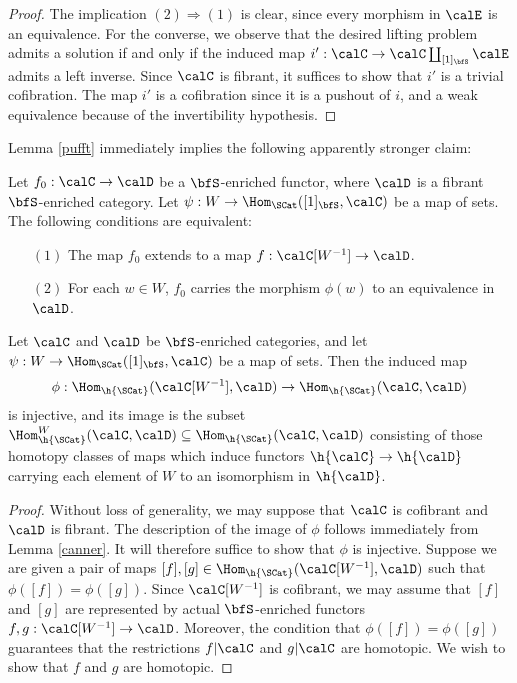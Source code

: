 \begin{Simplicial Categories}
\begin{proof}
The implication $(2) \Rightarrow (1)$ is clear, since every morphism in
$\calE$ is an equivalence. For the converse, we observe that
the desired lifting problem admits a solution if and only if the induced map
$i': \calC \rightarrow \calC \coprod_{[1]_{\bfS} } \calE$ admits a left inverse.
Since $\calC$ is fibrant, it suffices to show that $i'$ is a trivial cofibration.
The map $i'$ is a cofibration since it is a pushout of $i$, and a weak equivalence
because of the invertibility hypothesis. 
\end{proof}

Lemma \ref{pufft} immediately implies the following apparently stronger claim:

\begin{lemma}\label{canner}
Let $f_0: \calC \rightarrow \calD$ be a $\bfS$-enriched functor, where
$\calD$ is a fibrant $\bfS$-enriched category. Let $\psi: W \rightarrow \Hom_{\SCat}([1]_{\bfS},\calC)$ be a map of sets. The following conditions are equivalent:
\begin{itemize}
\item[$(1)$] The map $f_0$ extends to a map $f: \calC[W^{-1}] \rightarrow \calD$.
\item[$(2)$] For each $w \in W$, $f_0$ carries the morphism $\phi(w)$ to an equivalence in $\calD$.
\end{itemize}
\end{lemma}

\begin{proposition}\label{postcan}
Let $\calC$ and $\calD$ be $\bfS$-enriched categories, and let
$\psi: W \rightarrow \Hom_{\SCat}( [1]_{\bfS}, \calC)$ be a map of sets.
Then the induced map
$$ \phi: \Hom_{\h{\SCat}}( \calC[W^{-1}], \calD) \rightarrow \Hom_{\h{\SCat}}(\calC, \calD)$$
is injective, and its image is the subset $\Hom^{W}_{\h{\SCat}}(\calC, \calD)
\subseteq \Hom_{\h{\SCat}}(\calC, \calD)$ consisting of those homotopy classes of maps
which induce functors $\h{\calC} \rightarrow \h{\calD}$ carrying each element of $W$ to an isomorphism in $\h{\calD}$. 
\end{proposition}

\begin{proof}
Without loss of generality, we may suppose that $\calC$ is cofibrant and $\calD$ is fibrant.
The description of the image of $\phi$ follows immediately from Lemma \ref{canner}.
It will therefore suffice to show that $\phi$ is injective. Suppose we are given a pair of maps
$[f], [g] \in \Hom_{ \h{\SCat}}( \calC[W^{-1}], \calD)$ such that $\phi( [f] ) = \phi( [g] )$. Since
$\calC[ W^{-1}]$ is cofibrant, we may assume that $[f]$ and $[g]$ are represented by
actual $\bfS$-enriched functors $f,g: \calC[W^{-1}] \rightarrow \calD$. Moreover, the
condition that $\phi( [f] ) = \phi( [g] )$ guarantees that the restrictions
$f|\calC$ and $g|\calC$ are homotopic. We wish to show that $f$ and $g$ are homotopic.


\end{proof}
\end{Simplicial Categories}
